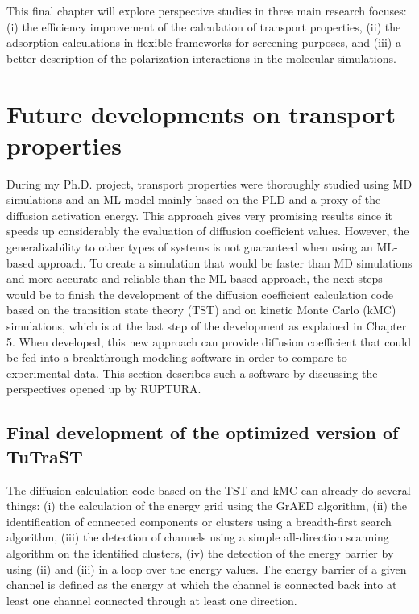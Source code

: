 \documentclass[main]{subfiles}
\begin{document}
This final chapter will explore perspective studies in three main research focuses: (i) the efficiency improvement of the calculation of transport properties, (ii) the adsorption calculations in flexible frameworks for screening purposes, and (iii) a better description of the polarization interactions in the molecular simulations.

\section{Future developments on transport properties}

During my Ph.D. project, transport properties were thoroughly studied using MD simulations and an ML model mainly based on the PLD and a proxy of the diffusion activation energy. This approach gives very promising results since it speeds up considerably the evaluation of diffusion coefficient values. However, the generalizability to other types of systems is not guaranteed when using an ML-based approach. To create a simulation that would be faster than MD simulations and more accurate and reliable than the ML-based approach, the next steps would be to finish the development of the diffusion coefficient calculation code based on the transition state theory (TST) and on kinetic Monte Carlo (kMC) simulations, which is at the last step of the development as explained in Chapter 5. When developed, this new approach can provide diffusion coefficient that could be fed into a breakthrough modeling software in order to compare to experimental data. This section describes such a software by discussing the perspectives opened up by RUPTURA\autocite{Sharma_2023}.

\subsection{Final development of the optimized version of TuTraST}

The diffusion calculation code based on the TST and kMC can already do several things: (i) the calculation of the energy grid using the GrAED algorithm, (ii) the identification of connected components or clusters using a breadth-first search algorithm, (iii) the detection of channels using a simple all-direction scanning algorithm on the identified clusters, (iv) the detection of the energy barrier by using (ii) and (iii) in a loop over the energy values. The energy barrier of a given channel is defined as the energy at which the channel is connected back into at least one channel connected through at least one direction. 
\end{document}
